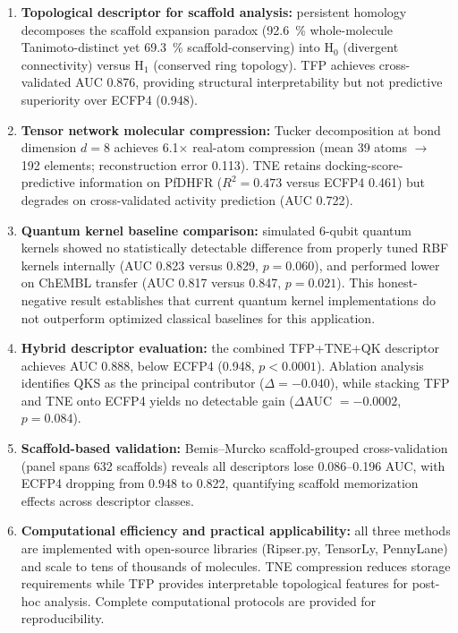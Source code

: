 \documentclass[9pt,a4paper]{article}
\begin{document}
\begin{enumerate}
\item \textbf{Topological descriptor for scaffold analysis:} persistent homology decomposes the scaffold expansion paradox (\qty{92.6}{\percent} whole-molecule Tanimoto-distinct yet \qty{69.3}{\percent} scaffold-conserving) into H$_0$ (divergent connectivity) versus H$_1$ (conserved ring topology). TFP achieves cross-validated AUC \num{0.876}, providing structural interpretability but not predictive superiority over ECFP4 (\num{0.948}).

\item \textbf{Tensor network molecular compression:} Tucker decomposition at bond dimension $d=8$ achieves \num{6.1}$\times$ real-atom compression (mean \num{39} atoms $\rightarrow$ \num{192} elements; reconstruction error \num{0.113}). TNE retains docking-score-predictive information on PfDHFR ($R^2 = \num{0.473}$ versus ECFP4 \num{0.461}) but degrades on cross-validated activity prediction (AUC \num{0.722}).

\item \textbf{Quantum kernel baseline comparison:} simulated 6-qubit quantum kernels showed no statistically detectable difference from properly tuned RBF kernels internally (AUC \num{0.823} versus \num{0.829}, $p = \num{0.060}$), and performed lower on ChEMBL transfer (AUC \num{0.817} versus \num{0.847}, $p = \num{0.021}$). This honest-negative result establishes that current quantum kernel implementations do not outperform optimized classical baselines for this application.

\item \textbf{Hybrid descriptor evaluation:} the combined TFP+TNE+QK descriptor achieves AUC \num{0.888}, below ECFP4 (\num{0.948}, $p < \num{0.0001}$). Ablation analysis identifies QKS as the principal contributor ($\Delta = -\num{0.040}$), while stacking TFP and TNE onto ECFP4 yields no detectable gain ($\Delta$AUC $= \num{-0.0002}$, $p = \num{0.084}$).

\item \textbf{Scaffold-based validation:} Bemis--Murcko scaffold-grouped cross-validation (panel spans \num{632} scaffolds) reveals all descriptors lose \numrange{0.086}{0.196} AUC, with ECFP4 dropping from \num{0.948} to \num{0.822}, quantifying scaffold memorization effects across descriptor classes.

\item \textbf{Computational efficiency and practical applicability:} all three methods are implemented with open-source libraries (Ripser.py, TensorLy, PennyLane) and scale to tens of thousands of molecules. TNE compression reduces storage requirements while TFP provides interpretable topological features for post-hoc analysis. Complete computational protocols are provided for reproducibility.
\end{enumerate}
\end{document}
